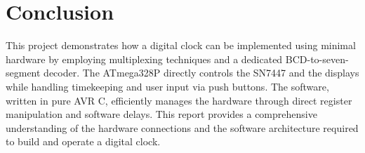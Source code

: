 \documentclass[12pt]{article}
\begin{document}
\section{Conclusion}
This project demonstrates how a digital clock can be implemented using minimal hardware by employing multiplexing techniques and a dedicated BCD-to-seven-segment decoder. The ATmega328P directly controls the SN7447 and the displays while handling timekeeping and user input via push buttons. The software, written in pure AVR C, efficiently manages the hardware through direct register manipulation and software delays. This report provides a comprehensive understanding of the hardware connections and the software architecture required to build and operate a digital clock.
\end{document}
